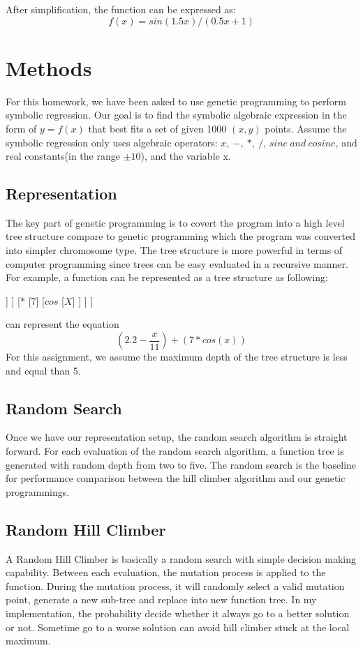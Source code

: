 \documentclass[12pt]{article}
\begin{document}
After simplification, the function can be expressed as:
\begin{equation}
f(x) = sin(1.5x)/(0.5x+1)
\end{equation}

\newpage
\section{Methods}
For this homework, we have been asked to use genetic programming to perform symbolic regression. Our goal is to find the symbolic algebraic expression in the form of $y=f(x)$ that best fits a set of given 1000 $(x,y)$ points. Assume the symbolic regression only uses algebraic operators: $x,\ -,\ *,\ /$, $sine\ and\ cosine$, and real constants(in the range $\pm10$), and the variable x.
\subsection{Representation}
The key part of genetic programming is to covert the program into a high level tree structure compare to genetic programming which the program was converted into simpler chromosome type. The tree structure is more powerful in terms of computer programming since trees can be easy evaluated in a recursive manner.
For example, a function can be represented as a tree structure as following:\\
\begin{center}
\begin{forest}
[$+$
	[$-$
		[2.2]
		[$\div$
			[$X$]
			[$11$]
		]
	]
	[$*$
		[$7$]
		[$cos$
			[$X$]
		]
	]
]
\end{forest}
\end{center}
can represent the equation
\begin{equation}
(2.2-\frac{x}{11})+(7*cos(x))
\end{equation}
For this assignment, we assume the maximum depth of the tree structure is less and equal than 5.
\subsection{Random Search}
Once we have our representation setup, the random search algorithm is straight forward. For each evaluation of the random search algorithm, a function tree is generated with random depth  from two to five. The random search is the baseline for performance comparison between the hill climber algorithm and our genetic programmings.
\subsection{Random Hill Climber}
A Random Hill Climber is basically a random search with simple decision making capability. Between each evaluation, the mutation process is applied to the function. During the mutation process, it will randomly select a valid mutation point, generate a new sub-tree and replace into new function tree. In my implementation, the probability decide whether it always go to a better solution or not. Sometime go to a worse solution can avoid hill climber stuck at the local maximum. 
\end{document}
